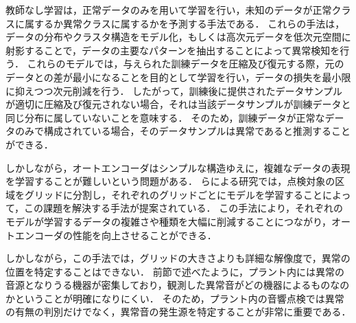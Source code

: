 \documentclass[../main]{subfiles}
\begin{document}
教師なし学習は，正常データのみを用いて学習を行い，未知のデータが正常クラスに属するか異常クラスに属するかを予測する手法である．
これらの手法は，データの分布やクラスタ構造をモデル化，もしくは高次元データを低次元空間に射影することで，データの主要なパターンを抽出することによって異常検知を行う．
これらのモデルでは，与えられた訓練データを圧縮及び復元する際，元のデータとの差が最小になることを目的として学習を行い，データの損失を最小限に抑えつつ次元削減を行う．
したがって，訓練後に提供されたデータサンプルが適切に圧縮及び復元されない場合，それは当該データサンプルが訓練データと同じ分布に属していないことを意味する．
そのため，訓練データが正常なデータのみで構成されている場合，そのデータサンプルは異常であると推測することができる．

しかしながら，オートエンコーダはシンプルな構造ゆえに，複雑なデータの表現を学習することが難しいという問題がある．
らによる研究では，点検対象の区域をグリッドに分割し，それぞれのグリッドごとにモデルを学習することによって，この課題を解決する手法が提案されている．
この手法により，それぞれのモデルが学習するデータの複雑さや種類を大幅に削減することにつながり，オートエンコーダの性能を向上させることができる．

しかしながら，この手法では，グリッドの大きさよりも詳細な解像度で，異常の位置を特定することはできない．
前節で述べたように，プラント内には異常の音源となりうる機器が密集しており，観測した異常音がどの機器によるものなのかということが明確になりにくい．
そのため，プラント内の音響点検では異常の有無の判別だけでなく，異常音の発生源を特定することが非常に重要である．
\end{document}
